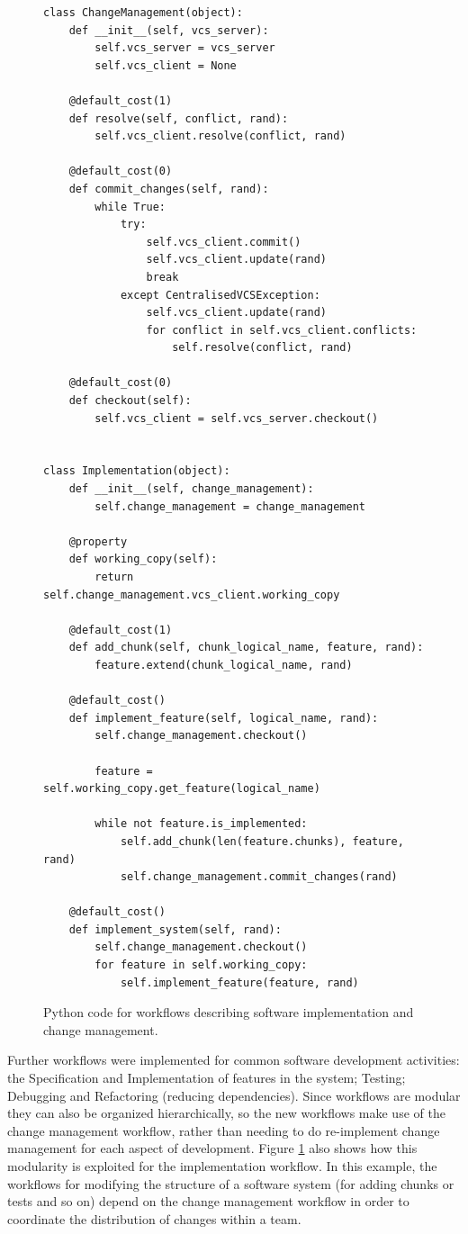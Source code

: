 \documentclass{llncs}
\begin{document}
\begin{figure}
  \centering
\begin{lstlisting}
class ChangeManagement(object):
    def __init__(self, vcs_server):
        self.vcs_server = vcs_server
        self.vcs_client = None

    @default_cost(1)
    def resolve(self, conflict, rand):
        self.vcs_client.resolve(conflict, rand)

    @default_cost(0)
    def commit_changes(self, rand):
        while True:
            try:
                self.vcs_client.commit()
                self.vcs_client.update(rand)
                break
            except CentralisedVCSException:
                self.vcs_client.update(rand)
                for conflict in self.vcs_client.conflicts:
                    self.resolve(conflict, rand)

    @default_cost(0)
    def checkout(self):
        self.vcs_client = self.vcs_server.checkout()


class Implementation(object):
    def __init__(self, change_management):
        self.change_management = change_management

    @property
    def working_copy(self):
        return self.change_management.vcs_client.working_copy

    @default_cost(1)
    def add_chunk(self, chunk_logical_name, feature, rand):
        feature.extend(chunk_logical_name, rand)

    @default_cost()
    def implement_feature(self, logical_name, rand):
        self.change_management.checkout()

        feature = self.working_copy.get_feature(logical_name)

        while not feature.is_implemented:
            self.add_chunk(len(feature.chunks), feature, rand)
            self.change_management.commit_changes(rand)

    @default_cost()
    def implement_system(self, rand):
        self.change_management.checkout()
        for feature in self.working_copy:
            self.implement_feature(feature, rand)

\end{lstlisting}
  \caption{Python code for workflows describing software implementation and change management.}
  \label{fig:workflows}

\end{figure}

Further workflows were implemented for common software development activities: the Specification and Implementation of
features in the system; Testing; Debugging and Refactoring (reducing dependencies).  Since workflows are modular they
can also be organized hierarchically, so the new workflows make use of the change management workflow, rather than
needing to do re-implement change management for each aspect of development.  Figure \ref{fig:workflows} also shows how
this modularity is exploited for the implementation workflow. In this example, the workflows for modifying the structure
of a software system (for adding chunks or tests and so on) depend on the change management workflow in order to
coordinate the distribution of changes within a team.
\end{document}
